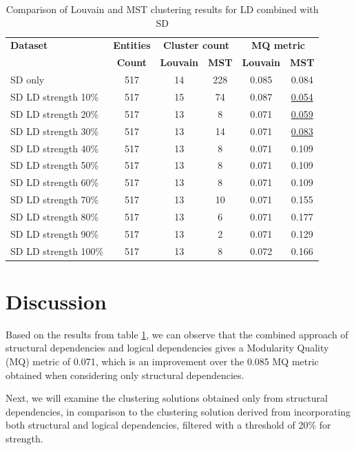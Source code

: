 \documentclass[conference]{IEEEtran}
\begin{document}
\begin{table}[htbp]
  \centering
  \caption{Comparison of Louvain and MST clustering results for LD combined with SD}
  \label{tab:clustering-results2}
  \begin{tabular}{lc|cc|cc}
    \toprule
    \textbf{Dataset} & \textbf{Entities} & \multicolumn{2}{c}{\textbf{Cluster count}} & \multicolumn{2}{c}{\textbf{MQ metric}} \\
    & \textbf{Count} & \textbf{Louvain} & \textbf{MST} & \textbf{Louvain} & \textbf{MST} \\
    \midrule
    SD only & 517 & 14 & 228 & 0.085 & 0.084 \\
    SD  LD strength 10\% & 517 & 15 & 74 & 0.087 & \underline{0.054} \\
    SD  LD strength 20\% & 517 & 13 & 8 & 0.071 & \underline{0.059} \\
    SD  LD strength 30\% & 517 & 13 & 14 & 0.071 & \underline{0.083} \\
    SD  LD strength 40\% & 517 & 13 & 8 & 0.071 & 0.109 \\
    SD  LD strength 50\% & 517 & 13 & 8 & 0.071 & 0.109 \\
    SD  LD strength 60\% & 517 & 13 & 8 & 0.071 & 0.109 \\
    SD  LD strength 70\% & 517 & 13 & 10 & 0.071 & 0.155 \\
    SD  LD strength 80\% & 517 & 13 & 6 & 0.071 & 0.177 \\
    SD  LD strength 90\% & 517 & 13 & 2 & 0.071 & 0.129 \\
    SD  LD strength 100\% & 517 & 13 & 8 & 0.072 & 0.166 \\
    \bottomrule
  \end{tabular}
\end{table}






\section{Discussion}

Based on the results from table \ref{tab:clustering-results2}, we can observe that the combined approach of structural dependencies and logical dependencies gives a Modularity Quality (MQ) metric of 0.071, which is an improvement over the 0.085 MQ metric obtained when considering only structural dependencies. 

Next, we will examine the clustering solutions obtained only from structural dependencies, in comparison to the clustering solution derived from incorporating both structural and logical dependencies, filtered with a threshold of 20\% for strength.
\end{document}
